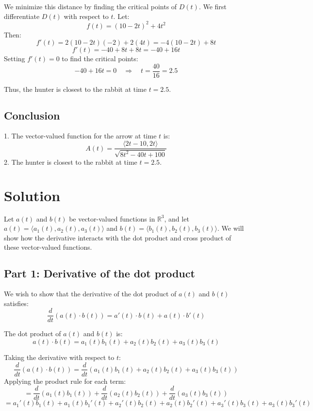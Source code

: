 \documentclass[11pt]{article}
\begin{document}
We minimize this distance by finding the critical points of \( D(t) \). We first differentiate \( D(t) \) with respect to \( t \). Let:
\[
f(t) = (10 - 2t)^2 + 4t^2
\]
Then:
\[
f'(t) = 2(10 - 2t)(-2) + 2(4t) = -4(10 - 2t) + 8t
\]
\[
f'(t) = -40 + 8t + 8t = -40 + 16t
\]
Setting \( f'(t) = 0 \) to find the critical points:
\[
-40 + 16t = 0 \quad \Rightarrow \quad t = \frac{40}{16} = 2.5
\]

Thus, the hunter is closest to the rabbit at time \( t = 2.5 \).

\newpage

\subsection{Conclusion}

1. The vector-valued function for the arrow at time \( t \) is:
\[
A(t) = \frac{\langle 2t - 10, 2t \rangle}{\sqrt{8t^2 - 40t + 100}}
\]
2. The hunter is closest to the rabbit at time \( t = 2.5 \).




\newpage

\section{Solution}

Let \( a(t) \) and \( b(t) \) be vector-valued functions in \( \mathbb{R}^3 \), and let \( a(t) = \langle a_1(t), a_2(t), a_3(t) \rangle \) and \( b(t) = \langle b_1(t), b_2(t), b_3(t) \rangle \). We will show how the derivative interacts with the dot product and cross product of these vector-valued functions.

\subsection{Part 1: Derivative of the dot product}

We wish to show that the derivative of the dot product of \( a(t) \) and \( b(t) \) satisfies:
\[
\frac{d}{dt} \left( a(t) \cdot b(t) \right) = a'(t) \cdot b(t) + a(t) \cdot b'(t)
\]

The dot product of \( a(t) \) and \( b(t) \) is:
\[
a(t) \cdot b(t) = a_1(t) b_1(t) + a_2(t) b_2(t) + a_3(t) b_3(t)
\]

Taking the derivative with respect to \( t \):
\[
\frac{d}{dt} \left( a(t) \cdot b(t) \right) = \frac{d}{dt} \left( a_1(t) b_1(t) + a_2(t) b_2(t) + a_3(t) b_3(t) \right)
\]
Applying the product rule for each term:
\[
= \frac{d}{dt} \left( a_1(t) b_1(t) \right) + \frac{d}{dt} \left( a_2(t) b_2(t) \right) + \frac{d}{dt} \left( a_3(t) b_3(t) \right)
\]
\[
= a_1'(t) b_1(t) + a_1(t) b_1'(t) + a_2'(t) b_2(t) + a_2(t) b_2'(t) + a_3'(t) b_3(t) + a_3(t) b_3'(t)
\]
\end{document}
